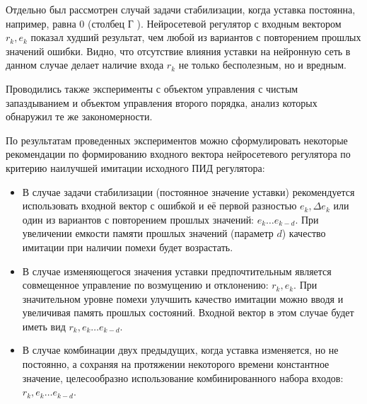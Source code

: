 Отдельно был рассмотрен случай задачи стабилизации, когда уставка
постоянна, например, равна 0 (столбец {\sf Г}
).  Нейросетевой регулятор с
входным вектором $r_k,e_k$ показал худший результат, чем любой из
вариантов с повторением прошлых значений ошибки.  Видно, что
отсутствие влияния уставки на нейронную сеть в данном случае делает
наличие входа $r_k$ не только бесполезным, но и вредным.

Проводились также эксперименты с объектом управления с чистым
запаздыванием и объектом управления второго порядка, анализ которых
обнаружил те же закономерности.

По результатам проведенных экспериментов можно сформулировать
некоторые рекомендации по формированию входного вектора нейросетевого
регулятора по критерию наилучшей имитации исходного ПИД регулятора:

\begin{itemize}\label{nnc-inputs-rules}
\item
В случае задачи стабилизации (постоянное значение уставки)
рекомендуется использовать входной вектор с ошибкой и её первой
разностью $e_k,\Delta e_k$ или один из вариантов с повторением прошлых
значений: $e_k\ldots e_{k-d}$.  При увеличении емкости памяти прошлых
значений (параметр $d$) качество имитации при наличии помехи будет
возрастать.

\item
В случае изменяющегося значения уставки предпочтительным является
совмещенное управление по возмущению и отклонению: $r_k,e_k$.  При
значительном уровне помехи улучшить качество имитации можно вводя и
увеличивая память прошлых состояний.  Входной вектор в этом случае
будет иметь вид $r_k,e_k\ldots e_{k-d}$.

\item
В случае комбинации двух предыдущих, когда уставка изменяется, но не
постоянно, а сохраняя на протяжении некоторого времени константное
значение, целесообразно использование комбинированного набора входов:
$r_k,e_k\ldots e_{k-d}$.
\end{itemize}




